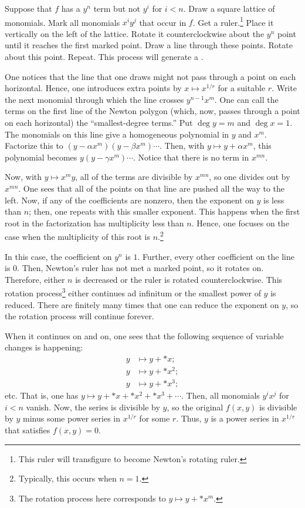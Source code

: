\documentclass [11 pt, oneside] {article}
\begin{document}
\begin{esquisse}
	Suppose that $f$ has a $y^n$ term but not $y^i$ for $i<n$. Draw a square lattice of monomials. Mark all monomials $x^iy^j$ that occur in $f$. Get a ruler.\footnote{This ruler will transfigure to become Newton's rotating ruler.} Place it vertically on the left of the lattice. Rotate it counterclockwise about the $y^n$ point until it reaches the first marked point. Draw a line through these points. Rotate about this point. Repeat. This process will generate a .

	One notices that the line that one draws might not pass through a point on each horizontal. Hence, one introduces extra points by $x\longmapsto x^{1/r}$ for a suitable $r$. Write the next monomial through which the line crosses $y^{n-1}x^m$. One can call the terms on the first line of the Newton polygon (which, now, passes through a point on each horizontal) the ``smallest-degree terms.'' Put $\deg y = m$ and $\deg x = 1$. The monomials on this line give a homogeneous polynomial in $y$ and $x^m$. Factorize this to $(y-\alpha x^m) (y-\beta x^m)\cdots$. Then, with $y\longmapsto y+\alpha x^m$, this polynomial becomes $y(y-\gamma x^m)\cdots$. Notice that there is no term in $x^{mn}$.

	Now, with $y\longmapsto x^my$, all of the terms are divisible by $x^{mn}$, so one divides out by $x^{mn}$. One sees that all of the points on that line are pushed all the way to the left. Now, if any of the coefficients are nonzero, then the exponent on $y$ is less than $n$; then, one repeats with this smaller exponent. This happens when the first root in the factorization has multiplicity less than $n$. Hence, one focuses on the case when the multiplicity of this root is $n$.\footnote{Typically, this occurs when $n=1$.}

	In this case, the coefficient on $y^n$ is $1$. Further, every other coefficient on the line is $0$. Then, Newton's ruler has not met a marked point, so it rotates on. Therefore, either $n$ is decreased or the ruler is rotated counterclockwise. This rotation process\footnote{The rotation process here corresponds to $y\longmapsto y + *x^m$.} either continues ad infinitum or the smallest power of $y$ is reduced. There are finitely many times that one can reduce the exponent on $y$, so the rotation process will continue forever.

	When it continues on and on, one sees that the following sequence of variable changes is happening:
	\begin{align*}
		y &\longmapsto y + *x;\\
		y &\longmapsto y + *x^2;\\
		y &\longmapsto y + *x^3;
	\end{align*}
	etc. That is, one has $y\longmapsto y + *x + *x^2 + *x^3 + \cdots$. Then, all monomials $y^ix^j$ for $i< n$ vanish. Now, the series is divisible by $y$, so the original $f(x,y)$ is divisible by $y$ minus some power series in $x^{1/r}$ for some $r$. Thus, $y$ is a power series in $x^{1/r}$ that satisfies $f(x,y)=0$.
\end{esquisse}
\end{document}
